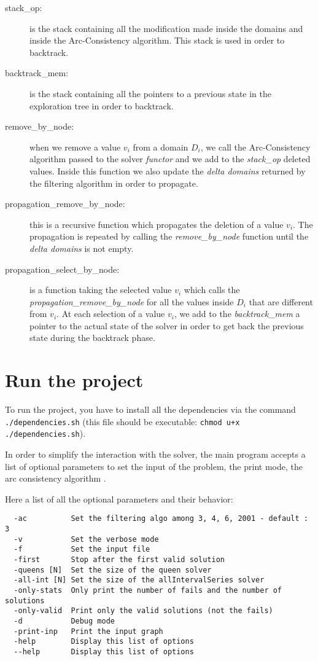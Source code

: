\documentclass{rapport}
\begin{document}
\begin{description}
  \item[stack\_op:] is the stack containing all the modification made inside the domains and inside the Arc-Consistency algorithm. This stack is used in order to backtrack.

  \item[backtrack\_mem:] is the stack containing all the pointers to a previous state in the exploration tree in order to backtrack.

  \item[remove\_by\_node:] when we remove a value $v_i$ from a domain $D_i$, we call the Arc-Consistency algorithm passed to the solver \textit{functor} and we add to the \textit{stack\_op} deleted values. Inside this function we also update the \textit{delta domains} returned by the filtering algorithm in order to propagate.

  \item[propagation\_remove\_by\_node:] this is a recursive function which propagates the deletion of a value $v_i$. The propagation is repeated by calling the \textit{remove\_by\_node} function until the \textit{delta domains} is not empty.

  \item[propagation\_select\_by\_node:] is a function taking the selected value $v_i$ which calls the \textit{propagation\_remove\_by\_node} for all the values inside $D_i$ that are different from $v_i$. At each selection of a value $v_i$, we add to the \textit{backtrack\_mem} a pointer to the actual state of the solver in order to get back the previous state during the backtrack phase.
\end{description}

\section{Run the project}
\label{sec:arg}
To run the project, you have to install all the dependencies via the command \texttt{./dependencies.sh} (this file should be executable: \texttt{chmod u+x ./dependencies.sh}).

In order to simplify the interaction with the solver, the main program accepts a list of optional parameters to set the input of the problem, the print mode, the arc consistency algorithm \etc.

Here a list of all the optional parameters and their behavior:

\begin{verbatim}
  -ac          Set the filtering algo among 3, 4, 6, 2001 - default : 3
  -v           Set the verbose mode
  -f           Set the input file
  -first       Stop after the first valid solution
  -queens [N]  Set the size of the queen solver
  -all-int [N] Set the size of the allIntervalSeries solver
  -only-stats  Only print the number of fails and the number of solutions
  -only-valid  Print only the valid solutions (not the fails)
  -d           Debug mode
  -print-inp   Print the input graph
  -help        Display this list of options
  --help       Display this list of options
\end{verbatim}
\end{document}

